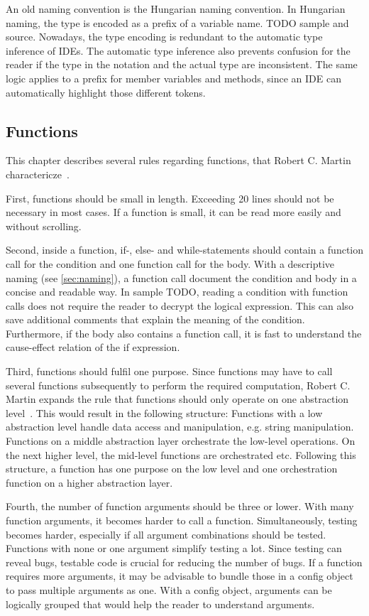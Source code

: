 An old naming convention is the Hungarian naming convention. In Hungarian naming, the type is encoded as a prefix of a variable name. TODO sample and source. Nowadays, the type encoding is redundant to the automatic type inference of IDEs. The automatic type inference also prevents confusion for the reader if the type in the notation and the actual type are inconsistent. The same logic applies to a prefix for member variables and methods, since an IDE can automatically highlight those different tokens.

\subsection{Functions}\label{sec:functions}
This chapter describes several rules regarding functions, that Robert C. Martin charactericze~\cite{martin_clean_2009}. 

First, functions should be small in length. Exceeding 20 lines should not be necessary in most cases. If a function is small, it can be read more easily and without scrolling. 

Second, inside a function, if-, else- and while-statements should contain a function call for the condition and one function call for the body. With a descriptive naming (see \ref{sec:naming}), a function call document the condition and body in a concise and readable way. In sample TODO, reading a condition with function calls does not require the reader to decrypt the logical expression. This can also save additional comments that explain the meaning of the condition. Furthermore, if the body also contains a function call, it is fast to understand the cause-effect relation of the if expression. 

Third, functions should fulfil one purpose. Since functions may have to call several functions subsequently to perform the required computation, Robert C. Martin expands the rule that functions should only operate on one abstraction level~\cite{martin_clean_2009}. This would result in the following structure:
Functions with a low abstraction level handle data access and manipulation, e.g. string manipulation. Functions on a middle abstraction layer orchestrate the low-level operations. On the next higher level, the mid-level functions are orchestrated etc. Following this structure, a function has one purpose on the low level and one orchestration function on a higher abstraction layer. 

Fourth, the number of function arguments should be three or lower. With many function arguments, it becomes harder to call a function. Simultaneously, testing becomes harder, especially if all argument combinations should be tested. Functions with none or one argument simplify testing a lot. Since testing can reveal bugs, testable code is crucial for reducing the number of bugs.
If a function requires more arguments, it may be advisable to bundle those in a config object to pass multiple arguments as one. With a config object, arguments can be logically grouped that would help the reader to understand arguments. 

